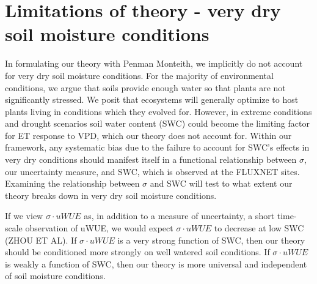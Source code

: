\documentclass[draft,linenumbers]{agujournal}
\begin{document}


\section{Limitations of theory - very dry soil moisture conditions}
In formulating our theory with Penman Monteith, we implicitly do not account for very dry soil moisture conditions. For the majority of environmental conditions, we argue that soils provide enough water so that plants are not significantly stressed. We posit that ecosystems will generally optimize to host plants living in conditions which they evolved for. However, in extreme conditions and drought scenarios soil water content (SWC) could become the limiting factor for ET response to VPD, which our theory does not account for. Within our framework, any systematic bias due to the  failure to account for SWC's effects in very dry conditions should manifest itself in a functional relationship between $\sigma$, our uncertainty measure, and SWC, which is observed at the FLUXNET sites. Examining the relationship between $\sigma$ and SWC will test to what extent our theory breaks down in very dry soil moisture conditions.

If we view $\sigma \cdot uWUE$ as, in addition to a measure of uncertainty, a short time-scale observation of uWUE, we would expect $\sigma \cdot uWUE$ to decrease at low SWC (ZHOU ET AL). If $\sigma \cdot uWUE$ is a very strong function of SWC, then our theory should be conditioned more strongly on well watered soil conditions. If $\sigma \cdot uWUE$ is weakly a function of SWC, then our theory is more universal and independent of soil moisture conditions.
\end{document}
